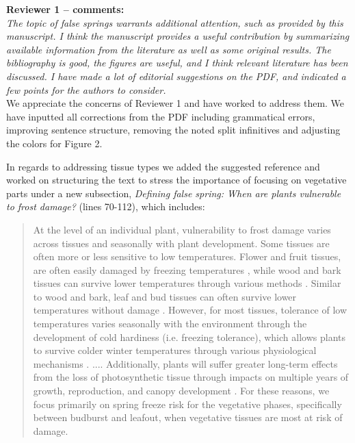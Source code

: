 \documentclass[11pt,a4paper]{article}
\begin{document}


\textbf {Reviewer 1 -- comments:} \\

\textit{The topic of false springs warrants additional attention, such as provided by this manuscript. I think the manuscript provides a useful contribution by summarizing available information from the literature as well as some original results. The bibliography is good, the figures are useful, and I think relevant literature has been discussed. I have made a lot of editorial suggestions on the PDF, and indicated a few points for the authors to consider.}\\


We appreciate the concerns of Reviewer 1 and have worked to address them. We have inputted all corrections from the PDF including grammatical errors, improving sentence structure, removing the noted split infinitives and adjusting the colors for Figure 2. 

In regards to addressing tissue types we added the suggested reference and worked on structuring the text to stress the importance of focusing on vegetative parts under a new subsection, \textit{Defining false spring: When are plants vulnerable to frost damage?} (lines 70-112), which includes:

\begin{quotation}
At the level of an individual plant, vulnerability to frost damage varies across tissues and seasonally with plant development. Some tissues are often more or less sensitive to low temperatures. Flower and fruit tissues, are often easily damaged by freezing temperatures \citep{Augspurger2009, Caradonna2016, Inouye2000, Lenz2013}, while wood and bark tissues can survive lower temperatures through various methods \citep{Strimbeck2015}. Similar to wood and bark, leaf and bud tissues can often survive lower temperatures without damage \citep{Charrier2011}. However, for most tissues, tolerance of low temperatures varies seasonally with the environment through the development of cold hardiness (i.e. freezing tolerance), which allows plants to survive colder winter temperatures through various physiological mechanisms \citep[] [e.g., deep supercooling, increased solute concentration, and an increase in dehydrins and other proteins] {Sakai1987, Strimbeck2015}. 
....
Additionally, plants will suffer greater long-term effects from the loss of photosynthetic tissue through impacts on multiple years of growth, reproduction, and canopy development \citep{Vitasse2014, Xie2015}.  For these reasons, we focus primarily on spring freeze risk for the vegetative phases, specifically between budburst and leafout, when vegetative tissues are most at risk of damage.
\end{quotation}
\end{document}
